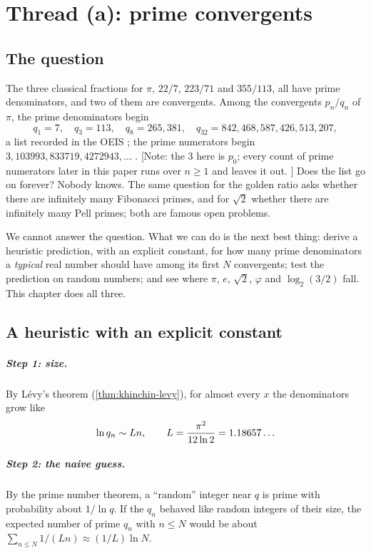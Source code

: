 \chapter{Thread (a): prime convergents}\label{ch:primeconv}

\section{The question}

The three classical fractions for $\pi$, $22/7$, $223/71$ and $355/113$, all have prime denominators, and two of them are convergents. Among the convergents $p_n/q_n$ of $\pi$, the prime denominators begin
\[
  q_1 = 7, \quad q_3 = 113, \quad q_8 = 265{,}381, \quad q_{32} = 842{,}468{,}587{,}426{,}513{,}207,
\]
a list recorded in the OEIS \citep{OEIS_A086788}; the prime numerators begin $3, 103993, 833719, 4272943, \dots$ \citep{OEIS_A086785}. [Note: the $3$ here is $p_0$; every count of prime numerators later in this paper runs over $n \ge 1$ and leaves it out. \addedon{\revC}] Does the list go on forever? Nobody knows. The same question for the golden ratio asks whether there are infinitely many Fibonacci primes, and for $\sqrt 2$ whether there are infinitely many Pell primes; both are famous open problems.

We cannot answer the question. What we can do is the next best thing: derive a heuristic prediction, with an explicit constant, for how many prime denominators a \emph{typical} real number should have among its first $N$ convergents; test the prediction on random numbers; and see where $\pi$, $e$, $\sqrt2$, $\varphi$ and $\log_2(3/2)$ fall. This chapter does all three.

\section{A heuristic with an explicit constant}

\paragraph{Step 1: size.} By Lévy's theorem (\cref{thm:khinchin-levy}), for almost every $x$ the denominators grow like
\begin{equation}\label{eq:levy}
  \ln q_n \sim L n, \qquad L = \frac{\pi^2}{12 \ln 2} = 1.18657\ldots
\end{equation}

\paragraph{Step 2: the naive guess.} By the prime number theorem, a ``random'' integer near $q$ is prime with probability about $1/\ln q$. If the $q_n$ behaved like random integers of their size, the expected number of prime $q_n$ with $n \le N$ would be about $\sum_{n \le N} 1/(Ln) \approx (1/L) \ln N$.

